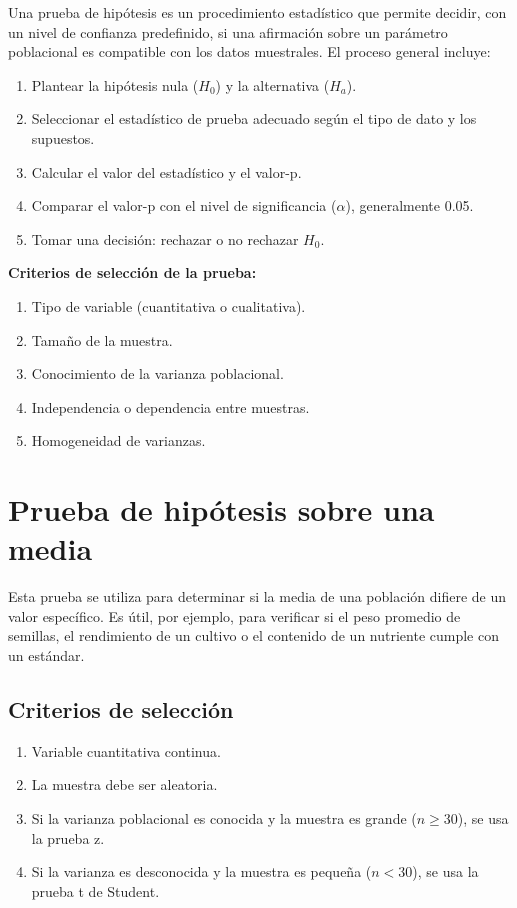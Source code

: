 \documentclass[
  spanish,
  letterpaper,
]{book}
\begin{document}
Una prueba de hipótesis es un procedimiento estadístico que permite
decidir, con un nivel de confianza predefinido, si una afirmación sobre
un parámetro poblacional es compatible con los datos muestrales. El
proceso general incluye:

\begin{enumerate}
\def\labelenumi{\arabic{enumi}.}
\item
  Plantear la hipótesis nula (\(H_0\)) y la alternativa (\(H_a\)).
\item
  Seleccionar el estadístico de prueba adecuado según el tipo de dato y
  los supuestos.
\item
  Calcular el valor del estadístico y el valor-p.
\item
  Comparar el valor-p con el nivel de significancia (\(\alpha\)),
  generalmente 0.05.
\item
  Tomar una decisión: rechazar o no rechazar \(H_0\).
\end{enumerate}

\textbf{Criterios de selección de la prueba:}

\begin{enumerate}
\def\labelenumi{\arabic{enumi}.}
\item
  Tipo de variable (cuantitativa o cualitativa).
\item
  Tamaño de la muestra.
\item
  Conocimiento de la varianza poblacional.
\item
  Independencia o dependencia entre muestras.
\item
  Homogeneidad de varianzas.
\end{enumerate}

\section{Prueba de hipótesis sobre una
media}\label{prueba-de-hipuxf3tesis-sobre-una-media}

Esta prueba se utiliza para determinar si la media de una población
difiere de un valor específico. Es útil, por ejemplo, para verificar si
el peso promedio de semillas, el rendimiento de un cultivo o el
contenido de un nutriente cumple con un estándar.

\subsection{Criterios de selección}\label{criterios-de-selecciuxf3n}

\begin{enumerate}
\def\labelenumi{\arabic{enumi}.}
\item
  Variable cuantitativa continua.
\item
  La muestra debe ser aleatoria.
\item
  Si la varianza poblacional es conocida y la muestra es grande
  (\(n \geq 30\)), se usa la prueba z.
\item
  Si la varianza es desconocida y la muestra es pequeña (\(n<30\)), se
  usa la prueba t de Student.
\end{enumerate}
\end{document}
